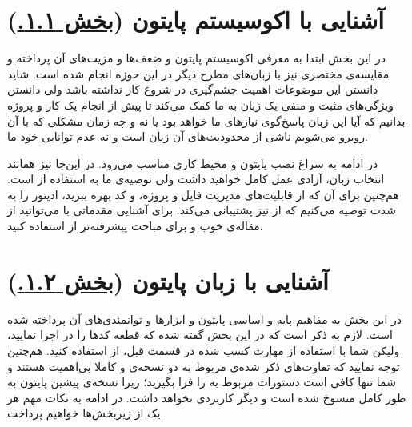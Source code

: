 \documentclass[11pt, a4paper]{article}
\begin{document}
\section{آشنایی با اکوسیستم پایتون  (\href{https://scipy-lectures.org/intro/intro.html}{بخش ۱.۱.})}
در این بخش ابتدا به معرفی اکوسیستم پایتون و ضعف‌ها و مزیت‌های آن پرداخته
و مقایسه‌ی مختصری نیز با زبان‌های مطرح دیگر در این حوزه انجام شده است.
شاید دانستن این موضوعات اهمیت چشم‌گیری در شروع کار نداشته باشد
ولی دانستن ویژگی‌های مثبت و منفی یک زبان به ما کمک می‌کند
تا پیش از انجام یک کار و پروژه بدانیم که آیا این‌ زبان پاسخ‌گوی نیاز‌های ما خواهد بود یا نه
و چه زمان مشکلی که با آن روبرو می‌شویم ناشی از محدودیت‌های آن زبان است و نه عدم توانایی خود ما.

در ادامه به سراغ نصب پایتون و محیط کاری مناسب می‌رود.
در این‌جا نیز همانند انتخاب زبان،
آزادی عمل کامل خواهید داشت ولی توصیه‌ی ما به استفاده از
\href{https://jupyter.org/}{}
است.
هم‌چنین برای آن که از قابلیت‌های مدیریت فایل و پروژه،
و
کد بهره ببرید،
ادیتور
\href{https://code.visualstudio.com/docs/languages/python}{}
را به شدت توصیه می‌کنیم که از
نیز پشتیبانی می‌کند.
برای آشنایی مقدماتی با
می‌توانید از مقاله‌ی خوب
\href{https://www.dataquest.io/blog/jupyter-notebook-tutorial/}{}
و برای مباحث پیشرفته‌تر از
\href{https://www.dataquest.io/blog/advanced-jupyter-notebooks-tutorial/}{}
استفاده کنید.


\section{آشنایی با زبان پایتون (\href{https://scipy-lectures.org/intro/language/python_language.html}{بخش ۱.۲.})}
در این بخش به مفاهیم پایه و اساسی پایتون و ابزار‌ها و توانمندی‌های آن پرداخته شده است.
لازم به ذکر است که در این بخش گفته شده که قطعه کد‌ها را در
اجرا نمایید، ولیکن شما با استفاده از مهارت کسب شده در قسمت قبل،
از
استفاده کنید.
هم‌چنین توجه نمایید که تفاوت‌های ذکر شده‌ی مربوط به دو نسخه‌ی
و
کاملا بی‌اهمیت هستند و شما تنها کافی است
دستورات مربوط به
را فرا بگیرید؛
زیرا نسخه‌ی پیشین پایتون به طور کامل منسوخ شده است و دیگر کاربردی نخواهد داشت.
در ادامه به نکات مهم هر یک از زیربخش‌ها خواهیم پرداخت.
\end{document}
